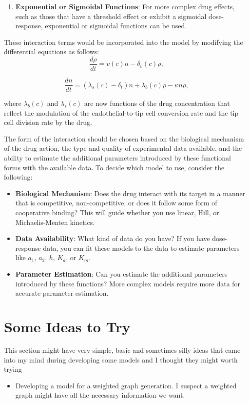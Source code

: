 \begin{enumerate}
	\item \textbf{Exponential or Sigmoidal Functions}: For more complex drug effects, such as those that have a threshold effect or exhibit a sigmoidal dose-response, exponential or sigmoidal functions can be used.
\end{enumerate}

These interaction terms would be incorporated into the model by modifying the differential equations as follows:
\[
\frac{d\rho}{dt} = v(c)n - \delta_v(c) \rho,
\]

\[
\frac{dn}{dt} = (\lambda_s(c) - \delta_t) n + \lambda_b(c) \rho - \kappa n \rho,
\]

where \( \lambda_b(c) \) and \( \lambda_s(c) \) are now functions of the drug concentration that reflect the modulation of the endothelial-to-tip cell conversion rate and the tip cell division rate by the drug.

The form of the interaction should be chosen based on the biological mechanism of the drug action, the type and quality of experimental data available, and the ability to estimate the additional parameters introduced by these functional forms with the available data.
To decide which model to use, consider the following:

\begin{itemize}
	\item \textbf{Biological Mechanism}: Does the drug interact with its target in a manner that is competitive, non-competitive, or does it follow some form of cooperative binding? This will guide whether you use linear, Hill, or Michaelis-Menten kinetics.
	\item \textbf{Data Availability}: What kind of data do you have? If you have dose-response data, you can fit these models to the data to estimate parameters like \( a_1 \), \( a_2 \), \( h \), \( K_d \), or \( K_m \).
	\item \textbf{Parameter Estimation}: Can you estimate the additional parameters introduced by these functions? More complex models require more data for accurate parameter estimation.
\end{itemize}





\newpage

\section{Some Ideas to Try}
This section might have very simple, basic and sometimes silly ideas that came into my mind during developing some models and I thought they might worth trying
\begin{itemize}
	\item Developing a model for a weighted graph generation. I suspect a weighted graph might have all the necessary information we want.
\end{itemize}